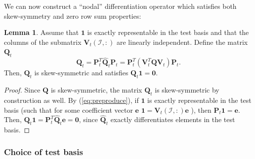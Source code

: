 \documentclass[preprint,10pt]{elsarticle}
\theoremstyle{definition}
\theoremstyle{lemma}
\newtheorem{lemma}{Lemma}
\theoremstyle{theorem}
\theoremstyle{assumption}
\renewcommand{\hat}{\widehat}
\newcommand{\LRp}[1]{\left( #1 \right)}
\begin{document}
We can now construct a ``nodal'' differentiation operator which satisfies both skew-symmetry and zero row sum properties: 
\begin{lemma}
Assume that $\bm{1}$ is exactly representable in the test basis and that the columns of the submatrix $\bm{V}_t\LRp{\mathcal{I},:}$ are linearly independent.  Define the matrix $\bm{Q}_t$
\begin{equation}
\bm{Q}_t = \bm{P}_t^T\hat{\bm{Q}}_t\bm{P}_t = \bm{P}_t^T\LRp{\bm{V}_t^T\bm{Q}\bm{V}_t}\bm{P}_t.
\label{eq:nodalQ}
\end{equation}
Then, $\bm{Q}_t$ is skew-symmetric and satisfies $\bm{Q}_t\bm{1} = \bm{0}$.  
\label{thm:Qt}
\end{lemma}
\begin{proof}
Since $\bm{Q}$ is skew-symmetric, the matrix $\bm{Q}_t$ is skew-symmetric by construction as well.  By (\ref{eq:preproduce}), if $\bm{1}$ is exactly representable in the test basis (such that for some coefficient vector $\bm{e}$ $\bm{1} = \bm{V}_t\LRp{\mathcal{I},:}\bm{e}$ ), then $\bm{P}_t\bm{1} = \bm{e}$.  Then, $\bm{Q}_t\bm{1} = \bm{P}_t^T\hat{\bm{Q}}_t\bm{e} = \bm{0}$, since $\hat{\bm{Q}}_t$ exactly differentiates elements in the test basis.
\end{proof}

\subsubsection{Choice of test basis}
\end{document}
